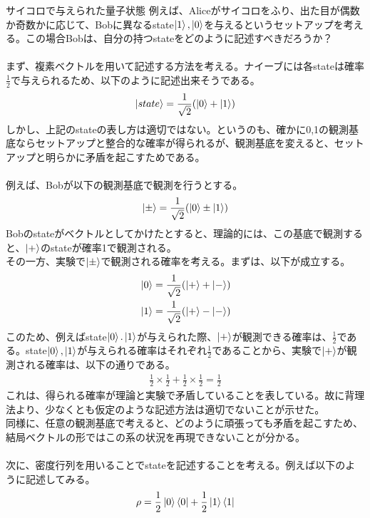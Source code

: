 \documentclass[a4paper,10.5pt]{article}
\numberwithin{equation}{section}
\begin{document}
\begin{examplebox}{サイコロで与えられた量子状態}
例えば、Aliceがサイコロをふり、出た目が偶数か奇数かに応じて、Bobに異なるstate$\ket{1},\ket{0}$を与えるというセットアップを考える。この場合Bobは、自分の持つstateをどのように記述すべきだろうか？\\
\\
まず、複素ベクトルを用いて記述する方法を考える。ナイーブには各stateは確率$\frac{1}{2}$で与えられるため、以下のように記述出来そうである。
\begin{align*}
\ket{state}=\frac{1}{\sqrt{2}}(\ket{0}+\ket{1})
\end{align*}
しかし、上記のstateの表し方は適切ではない。というのも、確かに0,1の観測基底ならセットアップと整合的な確率が得られるが、観測基底を変えると、セットアップと明らかに矛盾を起こすためである。\\
\\
例えば、Bobが以下の観測基底で観測を行うとする。
\begin{align}
\ket{\pm}=\frac{1}{\sqrt{2}}(\ket{0}\pm\ket{1})
\end{align}
Bobのstateがベクトルとしてかけたとすると、理論的には、この基底で観測すると、$\ket{+}$のstateが確率1で観測される。\\
その一方、実験で$\ket{\pm}$で観測される確率を考える。まずは、以下が成立する。
\begin{align}
&\ket{0}=\frac{1}{\sqrt{2}}(\ket{+}+\ket{-})\\
&\ket{1}=\frac{1}{\sqrt{2}}(\ket{+}-\ket{-})
\end{align}
このため、例えばstate$\ket{0}.\ket{1}$が与えられた際、$\ket{+}$が観測できる確率は、$\frac{1}{2}$である。state$\ket{0},\ket{1}$が与えられる確率はそれぞれ$\frac{1}{2}$であることから、実験で$\ket{+}$が観測される確率は、以下の通りである。
\begin{align}
\frac{1}{2}\times\frac{1}{2}+\frac{1}{2}\times\frac{1}{2}=\frac{1}{2}
\end{align}
これは、得られる確率が理論と実験で矛盾していることを表している。故に背理法より、少なくとも仮定のような記述方法は適切でないことが示せた。\\
同様に、任意の観測基底で考えると、どのように頑張っても矛盾を起こすため、結局ベクトルの形ではこの系の状況を再現できないことが分かる。\\
\\
次に、密度行列を用いることでstateを記述することを考える。例えば以下のように記述してみる。
\begin{align*}
\rho=\frac{1}{2}\ket{0}\bra{0}+\frac{1}{2}\ket{1}\bra{1}

\end{align*}
\end{examplebox}
\end{document}
